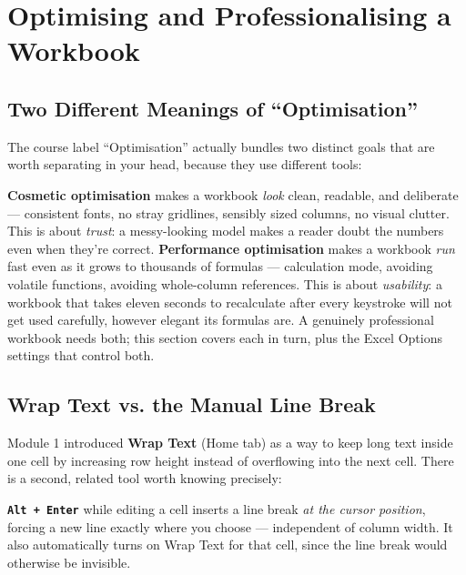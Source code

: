 \documentclass[11pt,a4paper]{article}
\newcommand{\key}[1]{\texttt{\colorbox{black!8}{\textbf{#1}}}}
\begin{document}
\section{Optimising and Professionalising a Workbook}
\label{sec:optimisation}

\subsection{Two Different Meanings of ``Optimisation''}

The course label ``Optimisation'' actually bundles two distinct goals that are worth separating in your head, because they use different tools:

\begin{keyconcept}
\textbf{Cosmetic optimisation} makes a workbook \emph{look} clean, readable, and deliberate --- consistent fonts, no stray gridlines, sensibly sized columns, no visual clutter. This is about \emph{trust}: a messy-looking model makes a reader doubt the numbers even when they're correct. \textbf{Performance optimisation} makes a workbook \emph{run} fast even as it grows to thousands of formulas --- calculation mode, avoiding volatile functions, avoiding whole-column references. This is about \emph{usability}: a workbook that takes eleven seconds to recalculate after every keystroke will not get used carefully, however elegant its formulas are. A genuinely professional workbook needs both; this section covers each in turn, plus the Excel Options settings that control both.
\end{keyconcept}

\subsection{Wrap Text vs. the Manual Line Break}

Module 1 introduced \textbf{Wrap Text} (Home tab) as a way to keep long text inside one cell by increasing row height instead of overflowing into the next cell. There is a second, related tool worth knowing precisely:

\begin{formulasyntax}
\key{Alt + Enter} while editing a cell inserts a line break \emph{at the cursor position}, forcing a new line exactly where you choose --- independent of column width. It also automatically turns on Wrap Text for that cell, since the line break would otherwise be invisible.
\end{formulasyntax}
\end{document}
